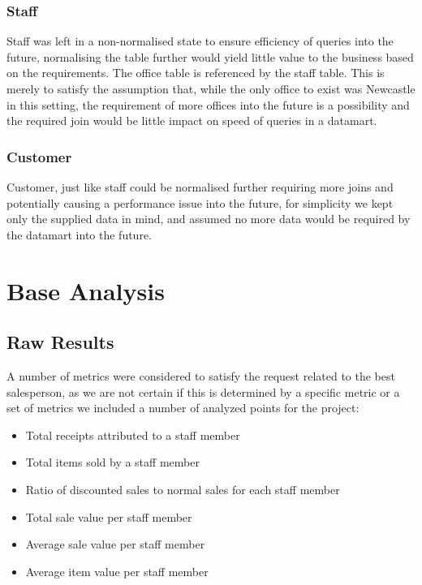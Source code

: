 \documentclass{article}
\begin{document}
            \subsubsection{Staff}
                Staff was left in a non-normalised state to ensure efficiency of queries into the future, 
                normalising the table further would yield little value to the business based on the requirements.
                The office table is referenced by the staff table. This is merely to satisfy the assumption
                that, while the only office to exist was Newcastle in this setting, the requirement of more 
                offices into the future is a possibility and the required join would be little impact on speed
                of queries in a datamart.
            \subsubsection{Customer}
                Customer, just like staff could be normalised further requiring more joins and potentially 
                causing a performance issue into the future, for simplicity we kept only the supplied
                data in mind, and assumed no more data would be required by the datamart into the future.

    \section{Base Analysis}
    \label{sec:BA}
        \subsection{Raw Results}
            A number of metrics were considered to satisfy the request related to the best salesperson,
            as we are not certain if this is determined by a specific metric or a set of metrics we 
            included a number of analyzed points for the project:
            \begin{itemize}
                \item Total receipts attributed to a staff member
                \item Total items sold by a staff member
                \item Ratio of discounted sales to normal sales for each staff member
                \item Total sale value per staff member
                \item Average sale value per staff member
                \item Average item value per staff member
            \end{itemize}
\end{document}
